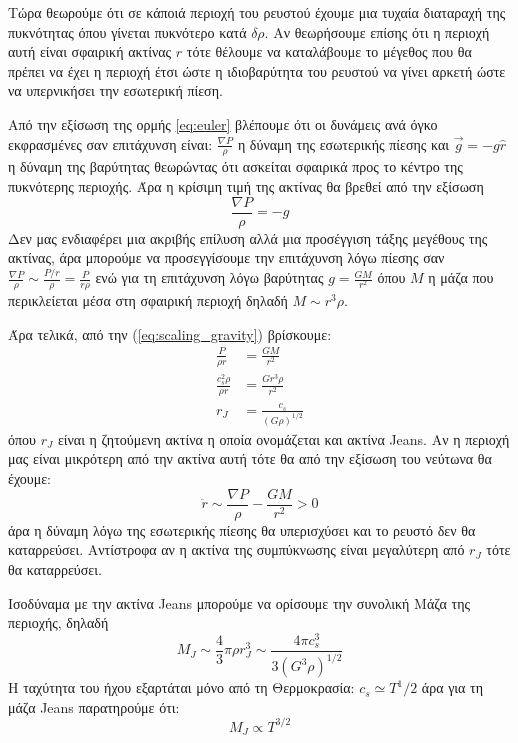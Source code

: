 \documentclass[a4paper,12pt]{memoir}
\begin{document}
Τώρα θεωρούμε ότι σε κάποιά περιοχή του ρευστού έχουμε μια τυχαία διαταραχή της πυκνότητας όπου γίνεται πυκνότερο κατά $\delta \rho$. Αν θεωρήσουμε επίσης ότι η περιοχή αυτή είναι σφαιρική ακτίνας $r$ τότε θέλουμε να καταλάβουμε το μέγεθος που θα πρέπει να έχει η περιοχή έτσι ώστε η ιδιοβαρύτητα του ρευστού να γίνει αρκετή ώστε να υπερνικήσει την εσωτερική πίεση.

Από την εξίσωση της ορμής \ref{eq:euler} βλέπουμε ότι οι δυνάμεις ανά όγκο εκφρασμένες σαν επιτάχυνση είναι: $\frac{\nabla P}{\rho}$ η δύναμη της εσωτερικής πίεσης και $\vec{g}=-g \hat{r}$ η δύναμη της βαρύτητας θεωρώντας ότι ασκείται σφαιρικά προς το κέντρο της πυκνότερης περιοχής.
Άρα η κρίσιμη τιμή της ακτίνας θα βρεθεί από την εξίσωση
\begin{equation} 
\label{eq:scaling_gravity}
\frac{\nabla P}{\rho} =-g
\end{equation}
Δεν μας ενδιαφέρει μια ακριβής επίλυση αλλά μια προσέγγιση τάξης μεγέθους της ακτίνας, άρα μπορούμε να προσεγγίσουμε την επιτάχυνση λόγω πίεσης σαν $\frac{\nabla P}{\rho} \sim \frac{P/r}{\rho}=\frac{P}{r \rho}$ ενώ για τη επιτάχυνση λόγω βαρύτητας $g=\frac{GM}{r^2}$ όπου $M$ η μάζα που περικλείεται μέσα στη σφαιρική περιοχή δηλαδή $M \sim r^3 \rho$.

Άρα τελικά, από την (\ref{eq:scaling_gravity}) βρίσκουμε:
\begin{align}
\frac{P}{\rho r} &= \frac{GM}{r^2} \\
\frac{c_s ^2 \rho}{\rho r} &= \frac{Gr^3 \rho}{r^2} \\
r_J&=\frac{c_s}{(G \rho)^{1/2}}
\end{align}
όπου $r_{J}$ είναι η ζητούμενη ακτίνα η οποία ονομάζεται και ακτίνα Jeans. Αν η περιοχή μας είναι μικρότερη από την ακτίνα αυτή τότε θα από την εξίσωση του νεύτωνα θα έχουμε: 
\begin{equation}
\label{eq:newton}
\ddot{r} \sim \frac{\nabla P}{\rho} -\frac{GM}{r^2} > 0
\end{equation}
άρα η δύναμη λόγω της εσωτερικής πίεσης θα υπερισχύσει και το ρευστό δεν θα καταρρεύσει. Αντίστροφα αν η ακτίνα της συμπύκνωσης είναι μεγαλύτερη από $r_J$ τότε θα καταρρεύσει.

Ισοδύναμα με την ακτίνα Jeans μπορούμε να ορίσουμε την συνολική Μάζα της περιοχής, δηλαδή
\begin{equation}
\boxed{M_J \sim \frac{4}{3} \pi \rho r_J ^3 \sim \frac{4\pi c_s ^3}{3 (G^3 \rho)^{1/2}}}
\end{equation}
Η ταχύτητα του ήχου εξαρτάται μόνο από τη Θερμοκρασία: $c_s \simeq T^1/2$ άρα για τη μάζα Jeans παρατηρούμε ότι:
\begin{equation}
M_J \propto T^{3/2}
\end{equation}
\end{document}
